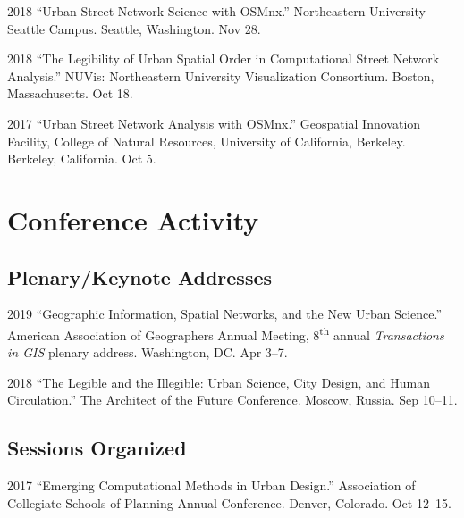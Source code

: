 \documentclass[12pt,letterpaper]{report}
\begin{document}
    \begin{tablist}

        \item[2018] \tab \enquote{Urban Street Network Science with OSMnx.} Northeastern University Seattle Campus. Seattle, Washington. Nov 28.

        \item[2018] \tab \enquote{The Legibility of Urban Spatial Order in Computational Street Network Analysis.} NUVis: Northeastern University Visualization Consortium. Boston, Massachusetts. Oct 18.

        \item[2017] \tab \enquote{Urban Street Network Analysis with OSMnx.} Geospatial Innovation Facility, College of Natural Resources, University of California, Berkeley. Berkeley, California. Oct 5.

    \end{tablist}


    \section*{Conference Activity}

    \subsection*{Plenary/Keynote Addresses}

    \begin{tablist}

        \item[2019] \tab \enquote{Geographic Information, Spatial Networks, and the New Urban Science.} American Association of Geographers Annual Meeting, 8\textsuperscript{th} annual \emph{Transactions in GIS} plenary address. Washington, DC. Apr 3--7.

        \item[2018] \tab \enquote{The Legible and the Illegible: Urban Science, City Design, and Human Circulation.} The Architect of the Future Conference. Moscow, Russia. Sep 10--11.

    \end{tablist}

    \subsection*{Sessions Organized}

    \begin{tablist}

        \item[2017] \tab \enquote{Emerging Computational Methods in Urban Design.} Association of Collegiate Schools of Planning Annual Conference. Denver, Colorado. Oct 12--15.

    \end{tablist}
\end{document}
